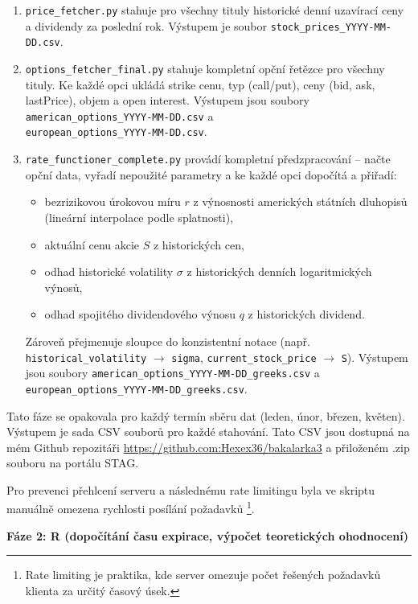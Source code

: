 \documentclass[male,czech,api_bc]{kitheses}
\begin{document}
  \begin{enumerate}
    \item \texttt{price\_fetcher.py} stahuje pro všechny tituly historické denní uzavírací ceny a dividendy za poslední rok. Výstupem je soubor \texttt{stock\_prices\_YYYY-MM-DD.csv}.
    \item \texttt{options\_fetcher\_final.py} stahuje kompletní opční řetězce pro všechny tituly. Ke každé opci ukládá strike cenu, typ (call/put), ceny (bid, ask, lastPrice), objem a open interest. Výstupem jsou soubory \texttt{american\_options\_YYYY-MM-DD.csv} a\\ \texttt{european\_options\_YYYY-MM-DD.csv}.
    \item \texttt{rate\_functioner\_complete.py} provádí kompletní předzpracování – načte opční data, vyřadí nepoužité parametry a ke každé opci dopočítá a přiřadí:
      \begin{itemize}
        \item bezrizikovou úrokovou míru \(r\) z výnosnosti amerických státních dluhopisů (lineární interpolace podle splatnosti),
        \item aktuální cenu akcie \(S\) z historických cen,
        \item odhad historické volatility \(\sigma\) z historických denních logaritmických výnosů,
        \item odhad spojitého dividendového výnosu \(q\) z historických dividend.
      \end{itemize}
    Zároveň přejmenuje sloupce do konzistentní notace (např. \texttt{historical\_volatility} $\to$ \texttt{sigma}, \texttt{current\_stock\_price} $\to$ \texttt{S}). Výstupem jsou soubory \texttt{american\_options\_YYYY-MM-DD\_greeks.csv} a \texttt{european\_options\_YYYY-MM-DD\_greeks.csv}.
  \end{enumerate}

  Tato fáze se opakovala pro každý termín sběru dat (leden, únor, březen, květen). Výstupem je sada CSV souborů pro každé stahování. Tato CSV jsou dostupná na mém Github repozitáři \url{https://github.com:Hexex36/bakalarka3} a přiloženém .zip souboru na portálu STAG.

  Pro prevenci přehlcení serveru a následnému rate limitingu byla ve skriptu manuálně omezena rychlosti posílání požadavků \footnote{Rate limiting je praktika, kde server omezuje počet řešených požadavků klienta za určitý časový úsek.}.

\bigskip
\noindent\textbf{Fáze 2: R (dopočítání času expirace, výpočet teoretických ohodnocení)}
\end{document}
